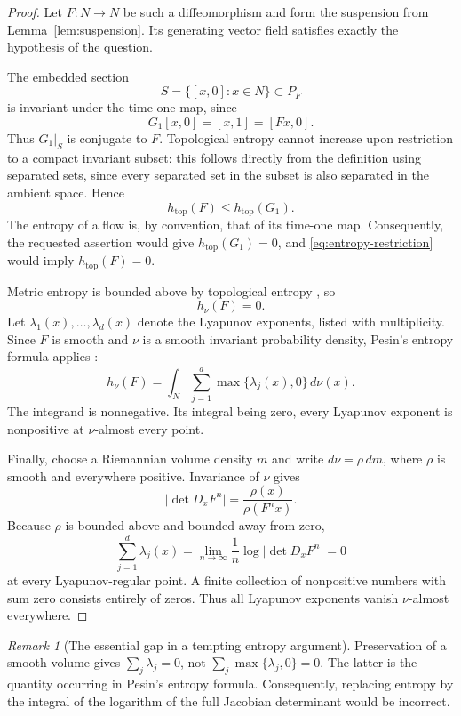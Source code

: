 \documentclass[11pt]{article}
\theoremstyle{definition}
\theoremstyle{remark}
\newtheorem*{remark}{Remark}
\newcommand{\htop}{h_{\mathrm{top}}}
\begin{document}
\begin{proof}
Let $F:N\to N$ be such a diffeomorphism and form the suspension from
Lemma~\ref{lem:suspension}. Its generating vector field satisfies
exactly the hypothesis of the question.

The embedded section
\[
 S=\{[x,0]:x\in N\}\subset P_F
\]
is invariant under the time-one map, since
\[
 G_1[x,0]=[x,1]=[Fx,0].
\]
Thus $G_1|_S$ is conjugate to $F$. Topological entropy cannot increase
upon restriction to a compact invariant subset: this follows directly
from the definition using separated sets, since every separated set
in the subset is also separated in the ambient space. Hence
\begin{equation}\label{eq:entropy-restriction}
 \htop(F)\leq\htop(G_1).
\end{equation}
The entropy of a flow is, by convention, that of its time-one map.
Consequently, the requested assertion would give
$\htop(G_1)=0$, and \eqref{eq:entropy-restriction} would imply
$\htop(F)=0$.

Metric entropy is bounded above by topological entropy
\cite{Goodwyn}, so
\[
 h_\nu(F)=0.
\]
Let $\lambda_1(x),\ldots,\lambda_d(x)$ denote the Lyapunov exponents,
listed with multiplicity. Since $F$ is smooth and $\nu$ is a smooth
invariant probability density, Pesin's entropy formula applies
\cite{Pesin}:
\[
 h_\nu(F)
 =
 \int_N\sum_{j=1}^d\max\{\lambda_j(x),0\}\,d\nu(x).
\]
The integrand is nonnegative. Its integral being zero, every Lyapunov
exponent is nonpositive at $\nu$-almost every point.

Finally, choose a Riemannian volume density $m$ and write
$d\nu=\rho\,dm$, where $\rho$ is smooth and everywhere positive.
Invariance of $\nu$ gives
\[
 \bigl|\det D_xF^n\bigr|
 =
 \frac{\rho(x)}{\rho(F^n x)}.
\]
Because $\rho$ is bounded above and bounded away from zero,
\[
 \sum_{j=1}^d\lambda_j(x)
 =
 \lim_{n\to\infty}\frac1n
       \log\bigl|\det D_xF^n\bigr|
 =
 0
\]
at every Lyapunov-regular point. A finite collection of nonpositive
numbers with sum zero consists entirely of zeros. Thus all Lyapunov
exponents vanish $\nu$-almost everywhere.
\end{proof}

\begin{remark}[The essential gap in a tempting entropy argument]
Preservation of a smooth volume gives
$\sum_j\lambda_j=0$, not
$\sum_j\max\{\lambda_j,0\}=0$.
The latter is the quantity occurring in Pesin's entropy formula.
Consequently, replacing entropy by the integral of the logarithm of
the full Jacobian determinant would be incorrect.
\end{remark}
\end{document}
